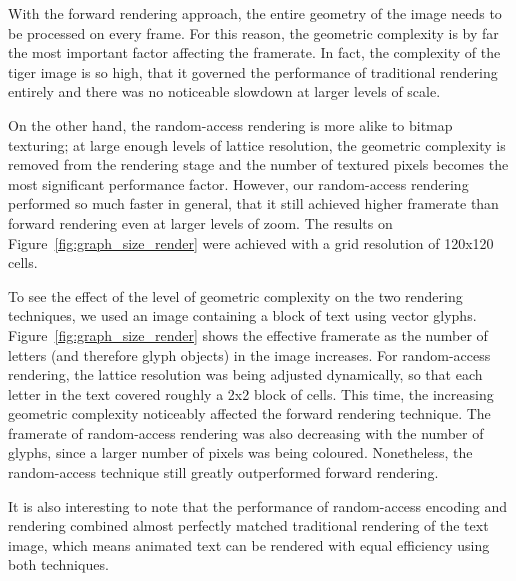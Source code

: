 \documentclass[11pt,a4paper,twoside]{article}
\begin{document}
With the forward rendering approach, the entire geometry of the image needs to be processed on every frame. For this reason, the geometric complexity is by far the most important factor affecting the framerate. In fact, the complexity of the tiger image is so high, that it governed the performance of traditional rendering entirely and there was no noticeable slowdown at larger levels of scale.

On the other hand, the random-access rendering is more alike to bitmap texturing; at large enough levels of lattice resolution, the geometric complexity is removed from the rendering stage and the number of textured pixels becomes the most significant performance factor. However, our random-access rendering performed so much faster in general, that it still achieved higher framerate than forward rendering even at larger levels of zoom. The results on Figure~\ref{fig:graph_size_render} were achieved with a grid resolution of 120x120 cells.

To see the effect of the level of geometric complexity on the two rendering techniques, we used an image containing a block of text using vector glyphs. Figure~\ref{fig:graph_size_render} shows the effective framerate as the number of letters (and therefore glyph objects) in the image increases. For random-access rendering, the lattice resolution was being adjusted dynamically, so that each letter in the text covered roughly a 2x2 block of cells. This time, the increasing geometric complexity noticeably affected the forward rendering technique. The framerate of random-access rendering was also decreasing with the number of glyphs, since a larger number of pixels was being coloured. Nonetheless, the random-access technique still greatly outperformed forward rendering.

It is also interesting to note that the performance of random-access encoding and rendering combined almost perfectly matched traditional rendering of the text image, which means animated text can be rendered with equal efficiency using both techniques.
\end{document}
